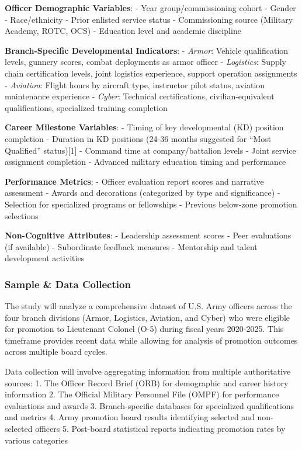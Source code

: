 \documentclass[
  letterpaper,
  DIV=11,
  numbers=noendperiod]{scrartcl}
\begin{document}
\textbf{Officer Demographic Variables}: - Year group/commissioning
cohort - Gender - Race/ethnicity - Prior enlisted service status -
Commissioning source (Military Academy, ROTC, OCS) - Education level and
academic discipline

\textbf{Branch-Specific Developmental Indicators}: - \emph{Armor}:
Vehicle qualification levels, gunnery scores, combat deployments as
armor officer - \emph{Logistics}: Supply chain certification levels,
joint logistics experience, support operation assignments -
\emph{Aviation}: Flight hours by aircraft type, instructor pilot status,
aviation maintenance experience - \emph{Cyber}: Technical
certifications, civilian-equivalent qualifications, specialized training
completion

\textbf{Career Milestone Variables}: - Timing of key developmental (KD)
position completion - Duration in KD positions (24-36 months suggested
for ``Most Qualified'' status){[}1{]} - Command time at
company/battalion levels - Joint service assignment completion -
Advanced military education timing and performance

\textbf{Performance Metrics}: - Officer evaluation report scores and
narrative assessment - Awards and decorations (categorized by type and
significance) - Selection for specialized programs or fellowships -
Previous below-zone promotion selections

\textbf{Non-Cognitive Attributes}: - Leadership assessment scores - Peer
evaluations (if available) - Subordinate feedback measures - Mentorship
and talent development activities

\subsubsection{Sample \& Data Collection}\label{sample-data-collection}

The study will analyze a comprehensive dataset of U.S. Army officers
across the four branch divisions (Armor, Logistics, Aviation, and Cyber)
who were eligible for promotion to Lieutenant Colonel (O-5) during
fiscal years 2020-2025. This timeframe provides recent data while
allowing for analysis of promotion outcomes across multiple board
cycles.

Data collection will involve aggregating information from multiple
authoritative sources: 1. The Officer Record Brief (ORB) for demographic
and career history information 2. The Official Military Personnel File
(OMPF) for performance evaluations and awards 3. Branch-specific
databases for specialized qualifications and metrics 4. Army promotion
board results identifying selected and non-selected officers 5.
Post-board statistical reports indicating promotion rates by various
categories
\end{document}
